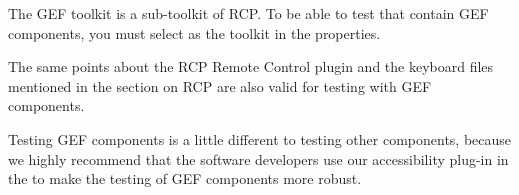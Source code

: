The GEF toolkit is a sub-toolkit of RCP. To be able to test \gdauts{} that contain GEF components, you must select  as the toolkit in the \gdproject{} properties. 

The same points about the RCP Remote Control plugin and the keyboard files mentioned in the section on RCP \gdauts{}  are also valid for testing \gdauts{} with GEF components. 

Testing GEF components is a little different to testing other components, because we highly recommend that the software developers use our accessibility plug-in in the \gdaut{} to make the testing of GEF components more robust. 

